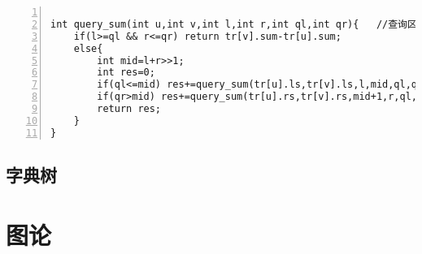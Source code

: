 \begin{lstlisting}[language={[ANSI]C},numbers=left]

int query_sum(int u,int v,int l,int r,int ql,int qr){	//查询区间和
	if(l>=ql && r<=qr) return tr[v].sum-tr[u].sum;
	else{
		int mid=l+r>>1;
		int res=0;
		if(ql<=mid) res+=query_sum(tr[u].ls,tr[v].ls,l,mid,ql,qr);
		if(qr>mid) res+=query_sum(tr[u].rs,tr[v].rs,mid+1,r,ql,qr);
		return res;
	}
}
\end{lstlisting}

\subsection{字典树}

\section{图论}
